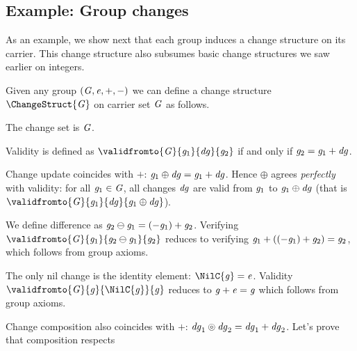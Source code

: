 \subsection{Example: Group changes}
\label{sec:change-structure-groups}

As an example, we show next that each group induces a change structure on its
carrier. This change structure also subsumes basic change structures we saw
earlier on integers.
\begin{definition}
\label{def:chs-group}
Given any group \ensuremath{(\Conid{G},\Varid{e},\mathbin{+},\mathbin{-})} we can define a change structure
\ensuremath{\ChangeStruct{\Conid{G}}} on carrier set \ensuremath{\Conid{G}} as follows.
\begin{subdefinition}
\item The change set is \ensuremath{\Conid{G}}.
\item Validity is defined as \ensuremath{\validfromto{\Conid{G}}{\Varid{g}_{1}}{\Varid{dg}}{\Varid{g}_{2}}} if and only if
  \ensuremath{\Varid{g}_{2}\mathrel{=}\Varid{g}_{1}\mathbin{+}\Varid{dg}}.
\item Change update coincides with \ensuremath{\mathbin{+}}: \ensuremath{\Varid{g}_{1}\oplus \Varid{dg}\mathrel{=}\Varid{g}_{1}\mathbin{+}\Varid{dg}}. Hence \ensuremath{\oplus } agrees \emph{perfectly} with validity: for all \ensuremath{\Varid{g}_{1}\in \Conid{G}}, all
  changes \ensuremath{\Varid{dg}} are valid from \ensuremath{\Varid{g}_{1}} to \ensuremath{\Varid{g}_{1}\oplus \Varid{dg}} (that is
  \ensuremath{\validfromto{\Conid{G}}{\Varid{g}_{1}}{\Varid{dg}}{\Varid{g}_{1}\oplus \Varid{dg}}}).
\item We define difference as \ensuremath{\Varid{g}_{2}\ominus \Varid{g}_{1}\mathrel{=}(\mathbin{-}\Varid{g}_{1})\mathbin{+}\Varid{g}_{2}}.
  Verifying \ensuremath{\validfromto{\Conid{G}}{\Varid{g}_{1}}{\Varid{g}_{2}\ominus \Varid{g}_{1}}{\Varid{g}_{2}}} reduces to
  verifying \ensuremath{\Varid{g}_{1}\mathbin{+}((\mathbin{-}\Varid{g}_{1})\mathbin{+}\Varid{g}_{2})\mathrel{=}\Varid{g}_{2}}, which follows from group axioms.
\item The only nil change is the identity element: \ensuremath{\NilC{\Varid{g}}\mathrel{=}\Varid{e}}.
  Validity \ensuremath{\validfromto{\Conid{G}}{\Varid{g}}{\NilC{\Varid{g}}}{\Varid{g}}} reduces to \ensuremath{\Varid{g}\mathbin{+}\Varid{e}\mathrel{=}\Varid{g}} which
  follows from group axioms.
\item Change composition also coincides with \ensuremath{\mathbin{+}}: \ensuremath{\Varid{dg}_{1}\circledcirc\Varid{dg}_{2}\mathrel{=}\Varid{dg}_{1}\mathbin{+}\Varid{dg}_{2}}. Let's prove that composition respects

\end{subdefinition}
\end{definition}

